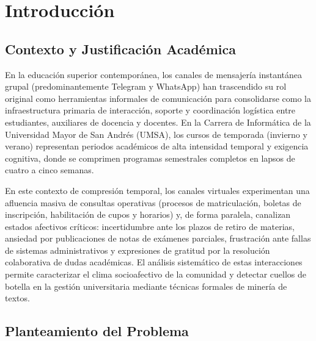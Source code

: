 \section{Introducción}
\label{sec:intro}

\subsection{Contexto y Justificación Académica}

En la educación superior contemporánea, los canales de mensajería instantánea grupal (predominantemente Telegram y WhatsApp) han trascendido su rol original como herramientas informales de comunicación para consolidarse como la infraestructura primaria de interacción, soporte y coordinación logística entre estudiantes, auxiliares de docencia y docentes. En la Carrera de Informática de la Universidad Mayor de San Andrés (UMSA), los cursos de temporada (invierno y verano) representan periodos académicos de alta intensidad temporal y exigencia cognitiva, donde se comprimen programas semestrales completos en lapsos de cuatro a cinco semanas. 

En este contexto de compresión temporal, los canales virtuales experimentan una afluencia masiva de consultas operativas (procesos de matriculación, boletas de inscripción, habilitación de cupos y horarios) y, de forma paralela, canalizan estados afectivos críticos: incertidumbre ante los plazos de retiro de materias, ansiedad por publicaciones de notas de exámenes parciales, frustración ante fallas de sistemas administrativos y expresiones de gratitud por la resolución colaborativa de dudas académicas. El análisis sistemático de estas interacciones permite caracterizar el clima socioafectivo de la comunidad y detectar cuellos de botella en la gestión universitaria mediante técnicas formales de minería de textos.

\subsection{Planteamiento del Problema}


